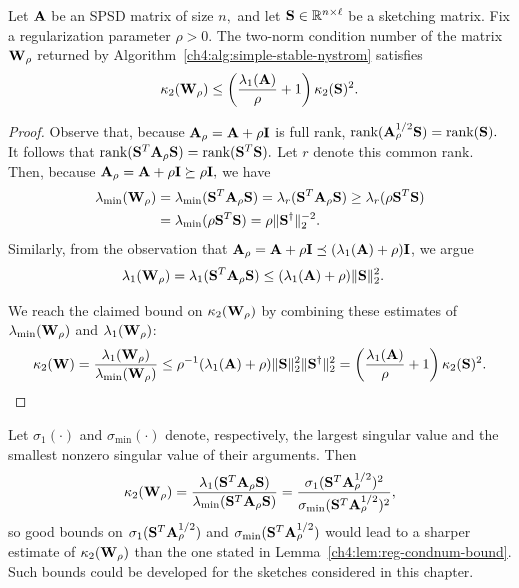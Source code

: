 \begin{lemma}
 Let $\mathbf{A}$ be an SPSD matrix of size $n,$ and let $\mathbf{S} \in \mathbb{R}^{n \times \ell}$ be a sketching matrix. Fix a
 regularization parameter $\rho > 0.$ The two-norm 
 condition number of the matrix $\mathbf{W}_\rho$
 returned by Algorithm~\ref{ch4:alg:simple-stable-nystrom} satisfies
 \[
  \kappa_2(\mathbf{W}_\rho) \leq \left( \frac{\lambda_1(\mathbf{A})}{\rho} + 1 \right) \kappa_2(\mathbf{S})^2.
 \]
\label{ch4:lem:reg-condnum-bound}
\end{lemma}

\begin{proof}
Observe that, because $\mathbf{A}_\rho = \mathbf{A} + \rho\mathbf{I}$ is full rank, $\text{rank}(\mathbf{A}_\rho^{1/2} \mathbf{S}) = \text{rank}(\mathbf{S}).$
It follows that $\text{rank}(\mathbf{S}^T \mathbf{A}_\rho \mathbf{S}) = \text{rank}(\mathbf{S}^T \mathbf{S}).$ Let $r$ denote this common rank. Then,
because $\mathbf{A}_\rho = \mathbf{A} + \rho \mathbf{I} \succeq \rho \mathbf{I},$ we have
\begin{align*}
 \lambda_\text{min}(\mathbf{W}_\rho) & = \lambda_\text{min}(\mathbf{S}^T \mathbf{A}_\rho \mathbf{S}) 
             = \lambda_r(\mathbf{S} ^T \mathbf{A}_\rho \mathbf{S}) 
             \geq \lambda_r(\rho \mathbf{S}^T \mathbf{S}) \\
             & = \lambda_{\text{min}}(\rho \mathbf{S}^T \mathbf{S}) =  \rho \|\mathbf{S}^\dagger \|_2^{-2}.
\end{align*}
Similarly, from the observation that $\mathbf{A}_\rho = \mathbf{A} + \rho \mathbf{I} \preceq (\lambda_1(\mathbf{A}) + \rho) \mathbf{I}$, we argue 
\begin{align*}
 \lambda_1(\mathbf{W}_\rho) & = \lambda_1(\mathbf{S}^T \mathbf{A}_\rho \mathbf{S}) \leq (\lambda_1(\mathbf{A}) + \rho) \|\mathbf{S}\|^2_2.
\end{align*}

We reach the claimed bound on $\kappa_2(\mathbf{W}_\rho)$ by combining these estimates of 
$\lambda_\text{min}(\mathbf{W}_\rho)$ and $\lambda_1(\mathbf{W}_\rho)$:
\[
 \kappa_2(\mathbf{W}) = \frac{\lambda_1(\mathbf{W}_\rho)}{\lambda_\text{min}(\mathbf{W}_\rho)} \leq 
  \rho^{-1}(\lambda_1(\mathbf{A}) + \rho) \|\mathbf{S}\|^2_2\|\mathbf{S}^\dagger\|_2^2 
  = \left( \frac{\lambda_1(\mathbf{A})}{\rho} + 1 \right) \kappa_2(\mathbf{S})^2.
\]

\end{proof}

\begin{remark}
 Let $\sigma_1(\cdot)$ and $\sigma_{\text{min}}(\cdot)$ denote, respectively, the 
 largest singular value and the smallest nonzero singular value of their arguments. Then
 \[
  \kappa_2(\mathbf{W}_\rho) = \frac{\lambda_1(\mathbf{S}^T \mathbf{A}_\rho \mathbf{S})}{\lambda_{\text{min}}(\mathbf{S}^T \mathbf{A}_\rho \mathbf{S})}
   = \frac{\sigma_1({\mathbf{S}^T \mathbf{A}_\rho^{1/2}})^2}{\sigma_{\text{min}}(\mathbf{S}^T \mathbf{A}_\rho^{1/2})^2},
 \]
so good bounds on $\sigma_1({\mathbf{S}^T \mathbf{A}_\rho^{1/2}})$ and $\sigma_{\text{min}}(\mathbf{S}^T \mathbf{A}_\rho^{1/2})$ 
would lead to a sharper estimate of $\kappa_2(\mathbf{W}_\rho)$ than the one stated in Lemma~\ref{ch4:lem:reg-condnum-bound}. Such
bounds could be developed for the sketches considered in this chapter.
\end{remark}

